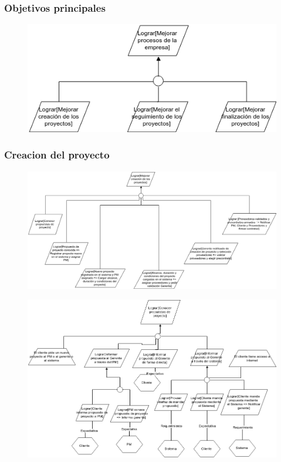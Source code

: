 \subsubsection{Objetivos principales}

\begin{figure}[H]
    \centering
    \includegraphics[width=\textwidth]{imagenes/objetivos-principales.png}
\end{figure}

\subsubsection{Creacion del proyecto}

\begin{figure}[H]
    \centering
    \includegraphics[width=18cm, keepaspectratio]{imagenes/objetivos-creacion-principal.png}
\end{figure}

\vspace{1em}

\begin{figure}[H]
    \centering
    \includegraphics[width=\textwidth]{imagenes/objetivos-creacion-1.png}
\end{figure}

